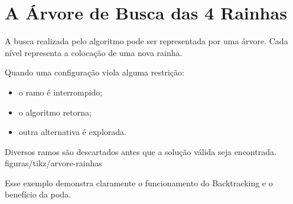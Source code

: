 \section{A Árvore de Busca das 4 Rainhas}

A busca realizada pelo algoritmo pode ser representada por uma árvore. Cada nível representa a colocação de uma nova rainha.

Quando uma configuração viola alguma restrição:

\begin{itemize}[leftmargin=1.4em]
  \item o ramo é interrompido;
  \item o algoritmo retorna;
  \item outra alternativa é explorada.
\end{itemize}

%
  {Diversos ramos são descartados antes que a solução válida seja encontrada.}%
  {figuras/tikz/arvore-rainhas}

Esse exemplo demonstra claramente o funcionamento do Backtracking e o benefício da poda.
